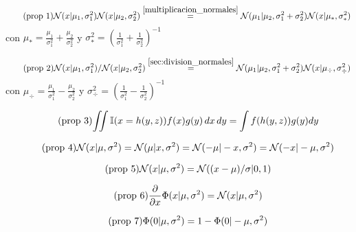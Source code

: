 \documentclass[article]{jss}
\newif\ifen
\newif\ifes
\newcommand{\en}[1]{\ifen#1\fi}
\newcommand{\es}[1]{\ifes#1\fi}
\newcommand{\N}{\mathcal{N}}
\begin{document}

\en{Let $\N$ be the Gaussian probability distribution, $\Phi$ the cumulative Gaussian distribution, $\mathbb{I}$ the indicator function.}
\es{Sea $\N$ la ditribuci\'on de probabilidad gaussiana, $\Phi$ la acumulada de una distribuc\'on gaussiana, $\mathbb{I}$ la funci\'on indicadora.}
%
\begin{equation}\label{eq:propiedad_1} \tag{\text{prop 1}}
\N(x|\mu_1,\sigma_1^2)\N(x|\mu_2,\sigma_2^2) \overset{\ref{multiplicacion_normales}}{=} \N(\mu_1|\mu_2,\sigma_1^2+\sigma_2^2) \N(x|\mu_{*},\sigma_{*}^2)
\end{equation}
%
con $\mu_{*} = \frac{\mu_1}{\sigma_1^2} + \frac{\mu_2}{\sigma_2^2}$ y $\sigma_{*}^2 = \left(\frac{1}{\sigma_1^2} + \frac{1}{\sigma_2^2} \right)^{-1}$ 

\begin{equation}\label{eq:propiedad_2} \tag{\text{prop 2}}
\N(x|\mu_1,\sigma_1^2)/\N(x|\mu_2,\sigma_2^2) \overset{\ref{sec:division_normales}}{=} \N(\mu_1|\mu_2,\sigma_1^2+\sigma_2^2) \N(x|\mu_{\div},\sigma_{\div}^2)
\end{equation}
%
con $\mu_{\div} = \frac{\mu_1}{\sigma_1^2} - \frac{\mu_2}{\sigma_2^2}$ y $\sigma_{\div}^2 = \left(\frac{1}{\sigma_1^2} - \frac{1}{\sigma_2^2} \right)^{-1}$ 

\begin{equation}\label{eq:integral_con_indicadora} \tag{\text{prop 3}}
\begin{split}
 \iint  \mathbb{I}(x=h(y,z)) f(x) g(y)\, dx\, dy = \int f(h(y,z)) g(y) dy
 \end{split}
\end{equation}

\begin{equation}\label{eq:simetria} \tag{\text{prop 4}}
 \N(x|\mu,\sigma^2) = \N(\mu|x,\sigma^2) = \N(-\mu|-x,\sigma^2) = \N(-x|-\mu,\sigma^2) 
\end{equation}

\begin{equation}\label{eq:estandarizar} \tag{\text{prop 5}}
  \N(x|\mu,\sigma^2) = \N((x-\mu)/\sigma | 0, 1)
\end{equation}

\begin{equation}\label{eq:phi_norm} \tag{\text{prop 6}}
 \frac{\partial}{\partial x} \Phi(x|\mu,\sigma^2) = \N(x|\mu,\sigma^2)
\end{equation}

\begin{equation}\label{eq:phi_simetria} \tag{\text{prop 7}}
\Phi(0|\mu,\sigma^2) = 1-\Phi(0|-\mu,\sigma^2)
\end{equation}
\end{document}
